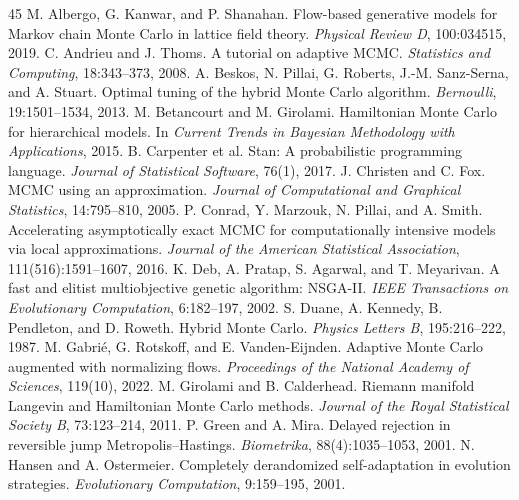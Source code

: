 \documentclass[11pt]{article}
\theoremstyle{remark}
\begin{document}
\begin{thebibliography}{45}\small
{} M. Albergo, G. Kanwar, and
P. Shanahan. Flow-based generative models for Markov chain Monte Carlo
in lattice field theory. \emph{Physical Review D}, 100:034515, 2019.
 C. Andrieu and J. Thoms.
A tutorial on adaptive MCMC. \emph{Statistics and Computing},
18:343--373, 2008.
 A. Beskos, N. Pillai,
G. Roberts, J.-M. Sanz-Serna, and A. Stuart. Optimal tuning of the
hybrid Monte Carlo algorithm. \emph{Bernoulli}, 19:1501--1534, 2013.
 M. Betancourt
and M. Girolami. Hamiltonian Monte Carlo for hierarchical models. In
\emph{Current Trends in Bayesian Methodology with Applications}, 2015.
 B. Carpenter et al. Stan: A
probabilistic programming language. \emph{Journal of Statistical
Software}, 76(1), 2017.
 J. Christen and C. Fox.
MCMC using an approximation. \emph{Journal of Computational and
Graphical Statistics}, 14:795--810, 2005.
 P. Conrad, Y. Marzouk,
N. Pillai, and A. Smith. Accelerating asymptotically exact MCMC for
computationally intensive models via local approximations.
\emph{Journal of the American Statistical Association},
111(516):1591--1607, 2016.
 K. Deb, A. Pratap, S. Agarwal, and
T. Meyarivan. A fast and elitist multiobjective genetic algorithm:
NSGA-II. \emph{IEEE Transactions on Evolutionary Computation},
6:182--197, 2002.
 S. Duane, A. Kennedy,
B. Pendleton, and D. Roweth. Hybrid Monte Carlo. \emph{Physics Letters
B}, 195:216--222, 1987.
 M. Gabri\'e, G. Rotskoff,
and E. Vanden-Eijnden. Adaptive Monte Carlo augmented with normalizing
flows. \emph{Proceedings of the National Academy of Sciences}, 119(10),
2022.
 M. Girolami and
B. Calderhead. Riemann manifold Langevin and Hamiltonian Monte Carlo
methods. \emph{Journal of the Royal Statistical Society B},
73:123--214, 2011.
 P. Green and A. Mira.
Delayed rejection in reversible jump Metropolis--Hastings.
\emph{Biometrika}, 88(4):1035--1053, 2001.
 N. Hansen and
A. Ostermeier. Completely derandomized self-adaptation in evolution
strategies. \emph{Evolutionary Computation}, 9:159--195, 2001.

\end{thebibliography}
\end{document}
